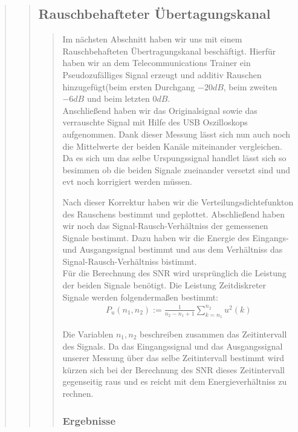 \begin{quote}
\begin{quote}
    \subsection{Rauschbehafteter Übertagungskanal}
    \begin{quote}
        Im nächsten Abschnitt haben wir uns mit einem Rauschbehafteten Übertragungskanal beschäftigt. Hierfür haben wir
        an dem Telecommunications Trainer ein Pseudozufälliges Signal erzeugt und additiv Rauschen hinzugefügt(beim
        ersten Durchgang $-20dB$, beim zweiten $-6dB$ und beim letzten $0dB$.\\
        Anschließend haben wir das Originalsignal sowie das verrauschte Signal mit Hilfe des USB Oszilloskops
        aufgenommen. Dank dieser Messung lässt sich nun auch noch die Mittelwerte der beiden Kanäle miteinander
        vergleichen. Da es sich um das selbe Urspungssignal handlet lässt sich so besimmen ob die beiden Signale
        zueinander versetzt sind und evt noch korrigiert werden müssen.\vspace{1em}
        
        Nach dieser Korrektur haben wir die Verteilungsdichtefunkton des Rauschens bestimmt und geplottet. Abschließend
        haben wir noch das Signal-Rausch-Verhältniss der gemessenen Signale bestimmt. Dazu haben wir die Energie des
        Eingangs- und Ausgangssignal bestimmt und aus dem Verhältniss das Signal-Rausch-Verhältniss bistimmt.\\
        Für die Berechnung des SNR wird ursprünglich die Leistung der beiden Signale benötigt. Die Leistung
        Zeitdiskreter Signale werden folgendermaßen bestimmt:
        \begin{equation*}
        	\begin{split}
        		P_u(n_1, n_2) := \frac{1}{n_2 - n_1 + 1} \sum_{k=n_1}^{n_2} u^2 (k)
        	\end{split}
        \end{equation*}
        
        Die Variablen $n_1,n_2$ beschreiben zusammen das Zeitintervall des Signals. Da das Eingangssignal und das
        Ausgangssignal unserer Messung über das selbe Zeitintervall bestimmt wird kürzen sich bei der Berechnung des SNR
        dieses Zeitintervall gegenseitig raus und es reicht mit dem Energieverhältniss zu rechnen.

        \subsubsection{Ergebnisse}
		\begin{quote}
		

\end{quote}
\end{quote}
\end{quote}
\end{quote}
